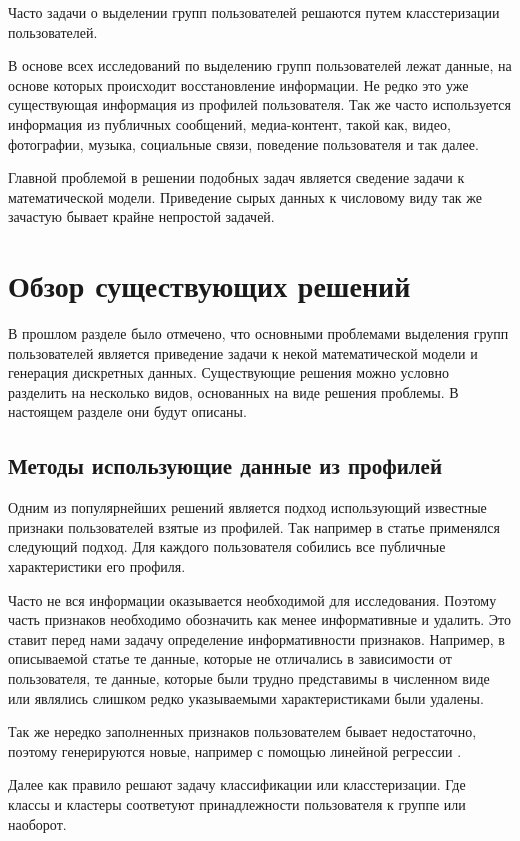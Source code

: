 \documentclass[annotation,times,page4]{itmo-student-thesis}
\begin{document}
Часто задачи о выделении групп пользователей решаются путем класстеризации пользователей.

В основе всех исследований по выделению групп пользователей лежат данные, на основе которых происходит восстановление информации. Не редко это уже существующая информация из профилей пользователя. Так же часто используется информация из публичных сообщений, медиа-контент, такой как, видео, фотографии, музыка, социальные связи, поведение пользователя и так далее.

Главной проблемой в решении подобных задач является сведение задачи к математической модели. Приведение сырых данных к числовому виду так же зачастую бывает крайне непростой задачей.
  
\section{Обзор существующих решений}
В прошлом разделе было отмечено, что основными проблемами выделения групп пользователей является приведение задачи к некой математической модели и генерация дискретных данных. Существующие решения можно условно разделить на несколько видов, основанных на виде решения проблемы. В настоящем разделе они будут описаны.
\subsection{Методы использующие данные из профилей}
Одним из популярнейших решений является подход использующий известные признаки пользователей взятые из профилей. Так например в статье \cite{golbeck2011predicting} применялся следующий подход. Для каждого пользователя собились все публичные характеристики его профиля. 

Часто не вся информации оказывается необходимой для исследования. Поэтому часть признаков необходимо обозначить как менее информативные и удалить. Это ставит перед нами задачу определение информативности признаков. Например, в описываемой статье те данные, которые не отличались в зависимости от пользователя, те данные, которые были трудно представимы в численном виде или являлись слишком редко указываемыми характеристиками были удалены.
 
Так же нередко заполненных признаков пользователем бывает недостаточно, поэтому генерируются новые, например с помощью линейной регрессии \cite{golbeck2011predicting}.

Далее как правило решают задачу классификации или класстеризации. Где классы и кластеры соответуют принадлежности пользователя к группе или наоборот.
\end{document}
